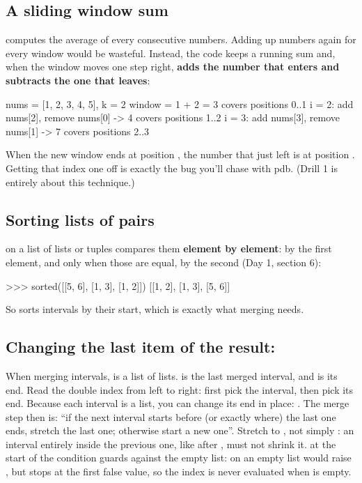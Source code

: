 \documentclass[10pt,a4paper]{article}
\begin{document}
\subsection{A sliding window sum}
 computes the average of every  consecutive numbers. Adding up  numbers again for every window would be wasteful. Instead, the code keeps a running  sum and, when the window moves one step right, \textbf{adds the number that enters and subtracts the one that leaves}:
\begin{txtcode}
nums = [1, 2, 3, 4, 5], k = 2
window = 1 + 2 = 3                        covers positions 0..1
i = 2: add nums[2], remove nums[0] -> 4   covers positions 1..2
i = 3: add nums[3], remove nums[1] -> 7   covers positions 2..3
\end{txtcode}
When the new window ends at position , the number that just left is at position . Getting that index one off is exactly the bug you’ll chase with pdb. (Drill 1 is entirely about this technique.)
\subsection{Sorting lists of pairs}
 on a list of lists or tuples compares them \textbf{element by element}: by the first element, and only when those are equal, by the second (Day 1, section 6):
\begin{txtcode}
>>> sorted([[5, 6], [1, 3], [1, 2]])
[[1, 2], [1, 3], [5, 6]]
\end{txtcode}
So  sorts intervals by their start, which is exactly what merging needs.
\subsection{Changing the last item of the result: }
When merging intervals,  is a list of  lists.  is the last merged interval, and  is its end. Read the double index from left to right: first pick the interval, then pick its end. Because each interval is a list, you can change its end in place: .
The merge step then is: “if the next interval starts before (or exactly where) the last one ends, stretch the last one; otherwise start a new one”. Stretch to , not simply : an interval entirely inside the previous one, like \code{[2,\allowbreak{}\ 3]} after \code{[1,\allowbreak{}\ 10]}, must not shrink it.
 at the start of the condition guards against the empty list:  on an empty list would raise , but  stops at the first false value, so the index is never evaluated when  is empty.
\end{document}

